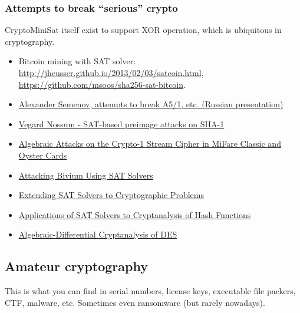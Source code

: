 \subsubsection{Attempts to break ``serious'' crypto}

CryptoMiniSat itself exist to support XOR operation, which is ubiquitous in cryptography.

\begin{itemize}
\item Bitcoin mining with SAT solver: \url{http://jheusser.github.io/2013/02/03/satcoin.html}, \url{https://github.com/msoos/sha256-sat-bitcoin}.

\item \href{http://2015.phdays.ru/program/dev/40400/}{Alexander Semenov, attempts to break A5/1, etc. (Russian presentation)}

\item \href{https://yurichev.com/mirrors/SAT_SMT_crypto/thesis-output.pdf}{Vegard Nossum - SAT-based preimage attacks on SHA-1}

\item \href{https://yurichev.com/mirrors/SAT_SMT_crypto/166.pdf}{Algebraic Attacks on the Crypto-1 Stream Cipher in MiFare Classic and Oyster Cards}

\item \href{https://yurichev.com/mirrors/SAT_SMT_crypto/Attacking-Bivium-Using-SAT-Solvers.pdf}{Attacking Bivium Using SAT Solvers}

\item \href{https://yurichev.com/mirrors/SAT_SMT_crypto/Extending_SAT_2009.pdf}{Extending SAT Solvers to Cryptographic Problems}

\item \href{https://yurichev.com/mirrors/SAT_SMT_crypto/sat-hash.pdf}{Applications of SAT Solvers to Cryptanalysis of Hash Functions}

\item \href{https://yurichev.com/mirrors/SAT_SMT_crypto/slidesC2DES.pdf}{Algebraic-Differential Cryptanalysis of DES}

\end{itemize}

\subsection{Amateur cryptography}

This is what you can find in serial numbers, license keys, executable file packers, \ac{CTF}, malware, etc.
Sometimes even ransomware (but rarely nowadays).

